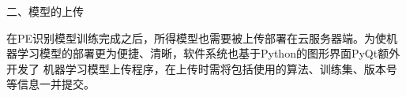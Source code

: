 






二、模型的上传

在PE识别模型训练完成之后，所得模型也需要被上传部署在云服务器端。为使机器学习模型的部署更为便捷、清晰，软件系统也基于Python的图形界面PyQt额外开发了
机器学习模型上传程序\cite{pyqt,zhiyiYo2023}，在上传时需将包括使用的算法、训练集、版本号等信息一并提交。%

